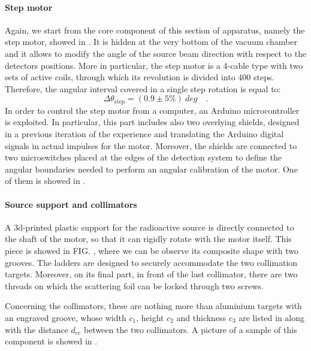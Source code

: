 \documentclass[../../main/main.tex]{subfiles}
\begin{document}
\paragraph{Step motor}
Again, we start from the core component of this section of apparatus, namely the step motor, showed in . It is hidden at the very bottom of the vacuum chamber and it allows to modify the angle of the source beam direction with respect to the detectors positions. More in particular, the step motor is a 4-cable type with two sets of active coils, through which its revolution is divided into 400 steps. Therefore, the angular interval covered in a single step rotation is equal to:
\begin{equation}
    \Delta \theta_{\mathrm{step}}
    =
    (0.9 \pm 5\%) \ \si{deg}
    \quad .
    \label{eq:mechanical_step}
\end{equation}
In order to control the step motor from a computer, an Arduino microcontroller is exploited. In particular, this part includes also two overlying shields, designed in a previous iteration of the experience and translating the Arduino digital signals in actual impulses for the motor. Moreover, the shields are connected to two microswitches placed at the edges of the detection system to define the angular boundaries needed to perform an angular calibration of the motor. One of them is showed in .


\paragraph{Source support and collimators}
A 3d-printed plastic support for the radioactive source is directly connected to the shaft of the motor, so that it can rigidly rotate with the motor itself. This piece is showed in FIG. , where we can be observe its composite shape with two grooves. The ladders are designed to securely accommodate the two collimation targets. Moreover, on its final part, in front of the last collimator, there are two threads on which the scattering foil can be locked through two screws.

Concerning the collimators, these are nothing more than aluminium targets with an engraved groove, whose width \( c_{1} \), height \( c_{2} \) and thickness \( c_{3} \) are listed in  along with the distance \( d_{\mathrm{cc}} \) between the two collimators. A picture of a sample of this component is showed in .
\end{document}
